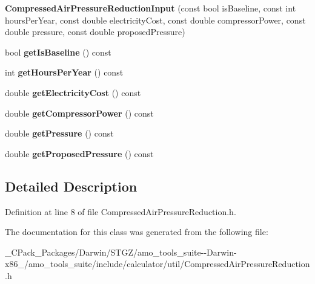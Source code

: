 \begin{DoxyCompactItemize}
{\bfseries Compressed\+Air\+Pressure\+Reduction\+Input} (const bool is\+Baseline, const int hours\+Per\+Year, const double electricity\+Cost, const double compressor\+Power, const double pressure, const double proposed\+Pressure)
\item 
\mbox{\label{class_compressed_air_pressure_reduction_input_a0ab9cf8226a03688bb37d1f8bd55f488}} 
bool {\bfseries get\+Is\+Baseline} () const
\item 
\mbox{\label{class_compressed_air_pressure_reduction_input_a0a87586eacee27fcecc81c0be80a3f7d}} 
int {\bfseries get\+Hours\+Per\+Year} () const
\item 
\mbox{\label{class_compressed_air_pressure_reduction_input_a340d012ba7c477679a32f967832f9f0b}} 
double {\bfseries get\+Electricity\+Cost} () const
\item 
\mbox{\label{class_compressed_air_pressure_reduction_input_aea1dd940ecefcd0f67847db4f74b1a92}} 
double {\bfseries get\+Compressor\+Power} () const
\item 
\mbox{\label{class_compressed_air_pressure_reduction_input_a9eadd70a4dd28b9269ad5e552e386583}} 
double {\bfseries get\+Pressure} () const
\item 
\mbox{\label{class_compressed_air_pressure_reduction_input_a9634619a70b92c4f318e2711e144e510}} 
double {\bfseries get\+Proposed\+Pressure} () const
\end{DoxyCompactItemize}


\subsection{Detailed Description}


Definition at line 8 of file Compressed\+Air\+Pressure\+Reduction.\+h.



The documentation for this class was generated from the following file\+:\begin{DoxyCompactItemize}
\item 
\+\_\+\+C\+Pack\+\_\+\+Packages/\+Darwin/\+S\+T\+G\+Z/amo\+\_\+tools\+\_\+suite-\/-\/\+Darwin-\/x86\+\_/amo\+\_\+tools\+\_\+suite/include/calculator/util/Compressed\+Air\+Pressure\+Reduction.\+h\end{DoxyCompactItemize}
